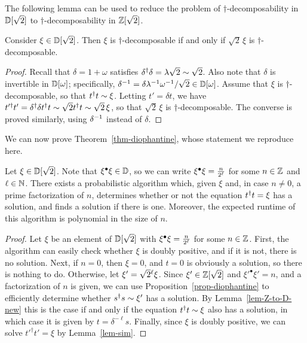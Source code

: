 The following lemma can be used to reduce the problem of
$\dagger$-decomposability in ${\mathbb{D}}[\sqrt2]$ to $\dagger$-decomposability
in $\mathbb{Z}[\sqrt2]$.

\begin{lemma}\label{lem-Z-to-D-new}
  Consider $\xi\in{\mathbb{D}}[\sqrt 2]$. Then $\xi$ is $\dagger$-decomposable
  if and only if $\sqrt2\,\xi$ is $\dagger$-decomposable.
\end{lemma}

\begin{proof}
  Recall that $\delta=1+\omega$ satisfies $\delta^{\dagger}\delta=\lambda\sqrt2 \sim
  \sqrt2$. Also note that $\delta$ is invertible in ${\mathbb{D}}[\omega]$;
  specifically, $\delta^{-1} = \delta\lambda^{-1}\omega^{-1}/\sqrt2 \in{\mathbb{D}}[\omega]$.
  Assume that $\xi$ is $\dagger$-decomposable, so that $t^{\dagger}
  t\sim\xi$. Letting $t'=\delta t$, we have
  $t'^{\dagger}t'=\delta^{\dagger}\delta t^{\dagger} t \sim \sqrt2 t^{\dagger} t\sim
  \sqrt2\,\xi$, so that $\sqrt2\,\xi$ is $\dagger$-decomposable.
  The converse is proved similarly, using $\delta^{-1}$ instead of
  $\delta$. 
\end{proof}

We can now prove Theorem~\ref{thm-diophantine}, whose statement we 
reproduce here.

\begin{un-theorem}
  Let $\xi\in{\mathbb{D}}[\sqrt 2]$. Note that $\xi^{\bullet}\xi\in{\mathbb{D}}$, so we can
  write $\xi^{\bullet}\xi=\frac{n}{2^\ell}$ for some $n\in\mathbb{Z}$ and $\ell\in\mathbb{N}$. 
  There exists a probabilistic algorithm which, given $\xi$ and, in 
  case $n\neq 0$, a prime factorization of $n$, determines whether or 
  not the equation $t^{\dagger} t =\xi$ has a solution, and finds a 
  solution if there is one. Moreover, the expected runtime of this 
  algorithm is polynomial in the size of $n$.
\end{un-theorem}

\begin{proof}
  Let $\xi$ be an element of ${\mathbb{D}}[\sqrt 2]$ with $\xi^{\bullet}\xi=
  \frac{n}{2^\ell}$ for some $n\in\mathbb{Z}$. First, the algorithm can easily
  check whether $\xi$ is doubly positive, and if it is not, there is
  no solution. Next, if $n=0$, then $\xi=0$, and $t=0$ is obviously a
  solution, so there is nothing to do. Otherwise, let $\xi'= {\sqrt{2}{}^{\ell}}\xi$. Since $\xi'\in \mathbb{Z}[\sqrt 2]$ and $\xi'^{\bullet} \xi'=n$, and
  a factorization of $n$ is given, we can use
  Proposition~\ref{prop-diophantine} to efficiently determine whether
  $s^{\dagger} s\sim \xi'$ has a solution. By
  Lemma~\ref{lem-Z-to-D-new} this is the case if and only if the equation
  $t^{\dagger} t\sim\xi$ also has a solution, in which case it is given by
  $t=\delta^{-\ell} s$. Finally, since $\xi$ is doubly positive, we can
  solve $t'^{\dagger}t'=\xi$ by Lemma~\ref{lem-sim}.
\end{proof}


